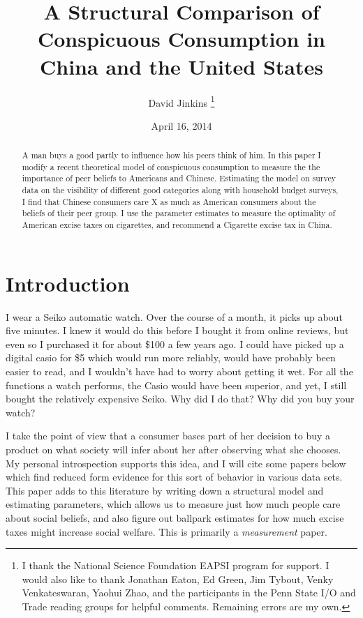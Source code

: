 \documentclass[12pt]{article}
\title{A Structural Comparison of Conspicuous Consumption in China and the United States
}
\author{David Jinkins
    \thanks{I thank the National Science Foundation EAPSI program for support.  I would also like to thank Jonathan Eaton, Ed Green, Jim Tybout, Venky Venkateswaran, Yaohui Zhao, and the participants in the Penn State I/O and Trade reading groups for helpful comments. Remaining errors are my own.}
}
\date{April 16, 2014}
\begin{document}
\maketitle

\begin{abstract}
    A man buys a good partly to influence how his peers think of him.  In this paper I modify a recent theoretical model of conspicuous consumption to measure the the importance of peer beliefs to Americans and Chinese.  Estimating the model on survey data on the visibility of different good categories along with household budget surveys, I find that Chinese consumers care X as much as American consumers about the beliefs of their peer group.  I use the parameter estimates to measure the optimality of American excise taxes on cigarettes, and recommend a Cigarette excise tax in China.
\end{abstract}

\section{Introduction}

I wear a Seiko automatic watch.  Over the course of a month, it picks up about five minutes.  I knew it would do this before I bought it from online reviews, but even so I purchased it for about \$100 a few years ago.  I could have picked up a digital casio for \$5 which would run more reliably, would have probably been easier to read, and I wouldn't have had to worry about getting it wet.  For all the functions a watch performs, the Casio would have been superior, and yet, I still bought the relatively expensive Seiko.  Why did I do that?  Why did you buy your watch?

I take the point of view that a consumer bases part of her decision to buy a product on what society will infer about her after observing what she chooses.  
My personal introspection supports this idea, and I will cite some papers below which find reduced form evidence for this sort of behavior in various data sets. This paper adds to this literature by writing down a structural model and estimating parameters, which allows us to measure just how much people care about social beliefs, and also figure out ballpark estimates for how much excise taxes might increase social welfare. This is primarily a \emph{measurement} paper.
\end{document}
